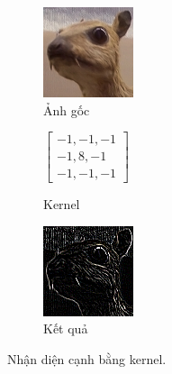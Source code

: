 \documentclass[12pt]{extreport}
\begin{document}
\begin{figure}[H]
    \centering
    \begin{subfigure}[H]{0.35\textwidth}
        \centering
        \includegraphics[width=0.5\linewidth]{figure7.png}
        \caption{Ảnh gốc}
    \end{subfigure}
    \begin{subfigure}[H]{0.25\textwidth}
        \centering
        \begin{math}
            \begin{bmatrix}
                -1, -1, -1 \\
                -1, 8, -1  \\
                -1, -1, -1
            \end{bmatrix}
        \end{math}
        \caption{Kernel}
    \end{subfigure}
    \begin{subfigure}[H]{0.35\textwidth}
        \centering
        \includegraphics[width=0.5\linewidth]{figure8.png}
        \caption{Kết quả}
    \end{subfigure}
    \caption{Nhận diện cạnh bằng kernel.}
\end{figure}
\end{document}
